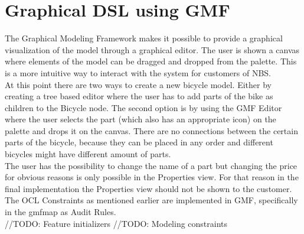 \section{Graphical DSL using GMF}
\label{sec.gmf}

\noindent
The Graphical Modeling Framework makes it possible to provide a 
graphical visualization of the model through a graphical editor. 
The user is shown a canvas where elements of the model can be dragged 
and dropped from the palette. This is a more intuitive way to interact 
with the system for customers of NBS.\\
At this point there are two ways to create a new bicycle model. 
Either by creating a tree based editor where the user has to add 
parts of the bike as children to the Bicycle node. The second option 
is by using the GMF Editor where the user selects the part (which also 
has an appropriate icon) on the palette and drops it on the canvas.
There are no connections between the certain parts of the bicycle, 
because they can be placed in any order and different bicycles might 
have different amount of parts.\\
The user has the possibility to change the name of a part but changing 
the price for obvious reasons is only possible in the Properties view. 
For that reason in the final implementation the Properties view should 
not be shown to the customer. The OCL Constraints as mentioned earlier 
are implemented in GMF, specifically in the gmfmap as Audit Rules.\\
//TODO: Feature initializers
//TODO: Modeling constraints
